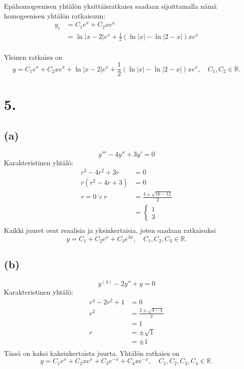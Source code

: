 \documentclass{article}
\begin{document}
Epähomogeenisen yhtälön yksittäisratkaisu saadaan sijoittamalla nämä
homogeenisen yhtälön rat\-kai\-suun:
\begin{align*}
  y_e &= C_1e^x + C_2xe^x \\
      &= \ln|x-2|e^x + \frac{1}{2}(\ln |x| - \ln |2-x|)xe^x \\
\end{align*}

Yleinen ratkaisu on
\[
  y = C_1e^x + C_2xe^x
    + \ln|x-2|e^x + \frac{1}{2}(\ln |x| - \ln |2-x|)xe^x, \quad C_1,C_2 \in \mathbb{R}.
\]

\section*{5.}

\subsection*{(a)}

\[
  y''' - 4y'' + 3y' = 0
\]
Karakteristinen yhtälö:
\begin{align*}
  r^3 - 4r^2 + 3r &= 0 \\
  r(r^2 - 4r + 3) &= 0 \\
  r = 0 \vee r &= \frac{4 \pm \sqrt{16 - 12}}{2} \\
               &= \begin{cases} 1 \\ 3 \end{cases} \\
\end{align*}
Kaikki juuret ovat reaalisia ja yksinkertaisia, joten saadaan ratkaisuksi
\[
  y = C_1 + C_2e^x + C_3e^{3x}, \quad C_1,C_2,C_3 \in \mathbb{R}.
\]

\subsection*{(b)}

\[
  y^{(4)} - 2y'' + y = 0
\]
Karakteristinen yhtälö:
\begin{align*}
  r^4 - 2r^2 + 1 &= 0 \\
  r^2 &= \frac{2 \pm \sqrt{4 - 4}}{2} \\
      &= 1 \\
  r &= \pm \sqrt{1} \\
    &= \pm 1 \\
\end{align*}
Tässä on kaksi kaksinkertaista juurta. Yhtälön ratkaisu on
\[
  y = C_1e^x + C_2xe^x + C_3e^{-x} + C_4xe^{-x}, \quad C_1,C_2,C_3,C_4 \in \mathbb{R}.
\]
\end{document}
